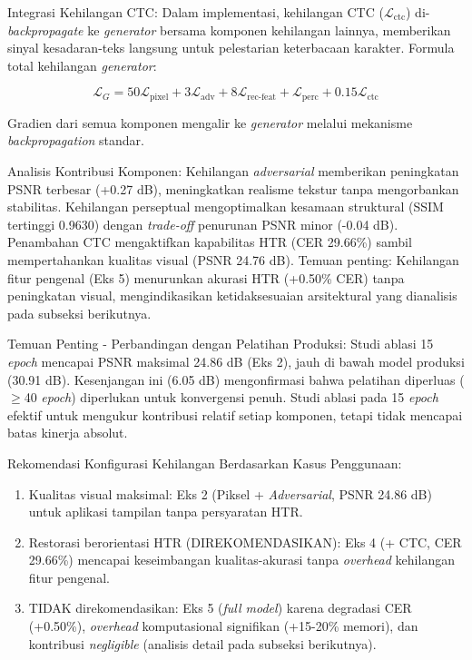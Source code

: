 \documentclass[journal]{IEEEtran}
\begin{document}
Integrasi Kehilangan CTC:
Dalam implementasi, kehilangan CTC ($\mathcal{L}_{\text{ctc}}$) di-\textit{backpropagate} ke \textit{generator} bersama komponen kehilangan lainnya, memberikan sinyal kesadaran-teks langsung untuk pelestarian keterbacaan karakter. Formula total kehilangan \textit{generator}:

\begin{equation}
\mathcal{L}_G = 50\mathcal{L}_{\text{pixel}} + 3\mathcal{L}_{\text{adv}} + 8\mathcal{L}_{\text{rec-feat}} + \mathcal{L}_{\text{perc}} + 0.15\mathcal{L}_{\text{ctc}}
\end{equation}

Gradien dari semua komponen mengalir ke \textit{generator} melalui mekanisme \textit{backpropagation} standar.

Analisis Kontribusi Komponen: Kehilangan \textit{adversarial} memberikan peningkatan PSNR terbesar (+0.27 dB), meningkatkan realisme tekstur tanpa mengorbankan stabilitas. Kehilangan perseptual mengoptimalkan kesamaan struktural (SSIM tertinggi 0.9630) dengan \textit{trade-off} penurunan PSNR minor (-0.04 dB). Penambahan CTC mengaktifkan kapabilitas HTR (CER 29.66\%) sambil mempertahankan kualitas visual (PSNR 24.76 dB). Temuan penting: Kehilangan fitur pengenal (Eks 5) menurunkan akurasi HTR (+0.50\% CER) tanpa peningkatan visual, mengindikasikan ketidaksesuaian arsitektural yang dianalisis pada subseksi berikutnya.

Temuan Penting - Perbandingan dengan Pelatihan Produksi: Studi ablasi 15 \textit{epoch} mencapai PSNR maksimal 24.86 dB (Eks 2), jauh di bawah model produksi (30.91 dB). Kesenjangan ini (6.05 dB) mengonfirmasi bahwa pelatihan diperluas ($\geq$40 \textit{epoch}) diperlukan untuk konvergensi penuh. Studi ablasi pada 15 \textit{epoch} efektif untuk mengukur kontribusi relatif setiap komponen, tetapi tidak mencapai batas kinerja absolut.

Rekomendasi Konfigurasi Kehilangan Berdasarkan Kasus Penggunaan:
\begin{enumerate}
    \item Kualitas visual maksimal: Eks 2 (Piksel + \textit{Adversarial}, PSNR 24.86 dB) untuk aplikasi tampilan tanpa persyaratan HTR.
    
    \item Restorasi berorientasi HTR (DIREKOMENDASIKAN): Eks 4 (+ CTC, CER 29.66\%) mencapai keseimbangan kualitas-akurasi tanpa \textit{overhead} kehilangan fitur pengenal.
    
    \item TIDAK direkomendasikan: Eks 5 (\textit{full model}) karena degradasi CER (+0.50\%), \textit{overhead} komputasional signifikan (+15-20\% memori), dan kontribusi \textit{negligible} (analisis detail pada subseksi berikutnya).
\end{enumerate}
\end{document}

